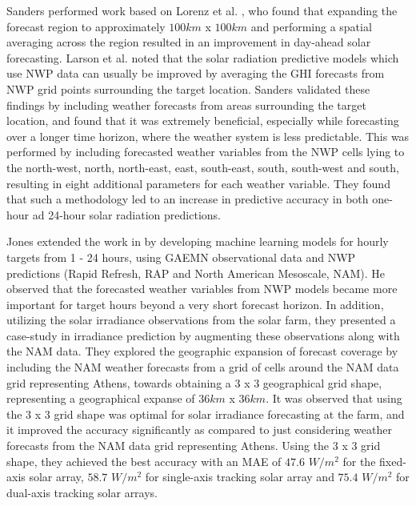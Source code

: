 \par Sanders \cite{publication_sanders} performed work based on Lorenz et al. \cite{expansion_lorenz}, who found that expanding the forecast region to approximately $100 km$ x $100km$ and performing a spatial averaging across the region resulted in an improvement in day-ahead solar forecasting. Larson et al. \cite{pvlib_larson} noted that the solar radiation predictive models which use NWP data can usually be improved by averaging the GHI forecasts from NWP grid points surrounding the target location. Sanders \cite{publication_sanders} validated these findings by including weather forecasts from areas surrounding the target location, and found that it was extremely beneficial, especially while forecasting over a longer time horizon, where the weather system is less predictable. This was performed by including forecasted weather variables from the NWP cells lying to the north-west, north, north-east, east, south-east, south, south-west and south, resulting in eight additional parameters for each weather variable. They found that such a methodology led to an increase in predictive accuracy in both one-hour ad 24-hour solar radiation predictions.

\par Jones \cite{thesis_zach} extended the work in \cite{publication_sanders} by developing machine learning models for hourly targets from 1 - 24 hours, using GAEMN observational data and NWP predictions (Rapid Refresh, RAP and North American Mesoscale, NAM). He observed that the forecasted weather variables from NWP models became more important for target hours beyond a very short forecast horizon. In addition, utilizing the solar irradiance observations from the solar farm, they presented a case-study in irradiance prediction by augmenting these observations along with the NAM data. They explored the geographic expansion of forecast coverage by including the NAM weather forecasts from a grid of cells around the NAM data grid representing Athens, towards obtaining a $3$ x $3$ geographical grid shape, representing a geographical expanse of $36km$ x $36km$. It was observed that using the $3$ x $3$ grid shape was optimal for solar irradiance forecasting at the farm, and it improved the accuracy significantly as compared to just considering weather forecasts from the NAM data grid representing Athens. Using the $3$ x $3$ grid shape, they achieved the best accuracy with an MAE of $47.6$ $W/m^{2}$ for the fixed-axis solar array, $58.7$ $W/m^{2}$ for single-axis tracking solar array and $75.4$ $W/m^{2}$ for dual-axis tracking solar arrays.

